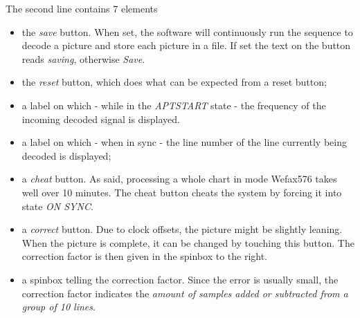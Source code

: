 \documentclass[11pt]{article}
\begin{document}
The second line contains 7 elements
\begin{itemize}
\item the {\em save} button. When set, the software will continuously
run the sequence to decode a picture and store each picture in a file.
If set the text on the button reads {\em saving}, otherwise {\em Save}.
\item the {\em reset} button, which does what
can be expected from a reset button;
\item a label on which - while in the {\em APTSTART} state - the frequency
of the incoming decoded signal is displayed.
\item a label on which - when in sync - the line number
of the line currently being decoded is displayed;
\item a {\em cheat} button. As said, processing a whole chart in mode Wefax576
takes well over 10 minutes. The cheat button cheats the system by forcing
it into state {\em ON SYNC}.
\item a {\em correct} button. Due to clock offsets, the picture might be slightly leaning.
When the picture is complete, it can be changed by touching this button.
The correction factor is then given in the spinbox to the right.
\item a spinbox telling the correction factor. Since the error is usually
small, the correction factor indicates the {\em amount of samples added
or subtracted from a group of 10 lines}.
\end{itemize}
\end{document}
